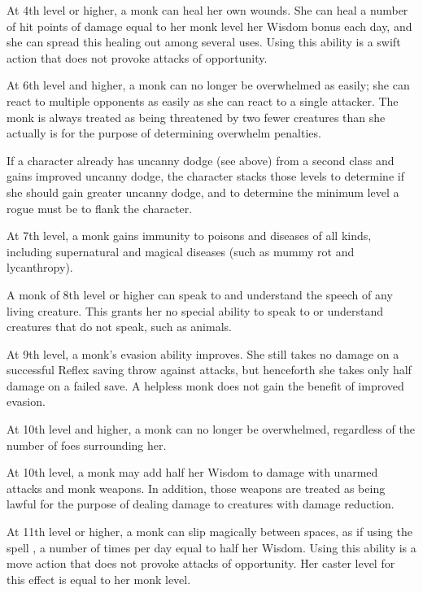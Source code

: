   At 4th level or higher, a monk can heal her own wounds. She can heal a number of hit points of damage equal to her monk level \mtimes her Wisdom bonus each day, and she can spread this healing out among several uses.  Using this ability is a swift action that does not provoke attacks of opportunity.

 At 6th level and higher, a monk can no longer be overwhelmed as easily; she can react to multiple opponents as easily as she can react to a single attacker. The monk is always treated as being threatened by two fewer creatures than she actually is for the purpose of determining overwhelm penalties.
\par If a character already has uncanny dodge (see above) from a
second class and gains improved uncanny dodge, the character stacks those levels to determine if she should gain greater uncanny dodge, and to determine the minimum level a rogue must be to flank the character.

 At 7th level, a monk gains immunity to poisons and diseases of all kinds, including supernatural and magical diseases (such as mummy rot and lycanthropy).

 A monk of 8th level or higher can speak to and understand the speech of any living creature. This grants her no special ability to speak to or understand creatures that do not speak, such as animals.

 At 9th level, a monk's evasion ability improves. She still takes no damage on a successful Reflex saving throw against attacks, but henceforth she takes only half damage on a failed save. A helpless monk does not gain the benefit of improved evasion.

 At 10th level and higher, a monk can no longer be overwhelmed, regardless of the number of foes surrounding her.

 At 10th level, a monk may add half her Wisdom to damage with unarmed attacks and monk weapons. In addition, those weapons are treated as being lawful for the purpose of dealing damage to creatures with damage reduction.

 At 11th level or higher, a monk can slip magically between spaces, as if using the spell , a number of times per day equal to half her Wisdom. Using this ability is a move action that does not provoke attacks of opportunity. Her caster level for this effect is equal to her monk level.

